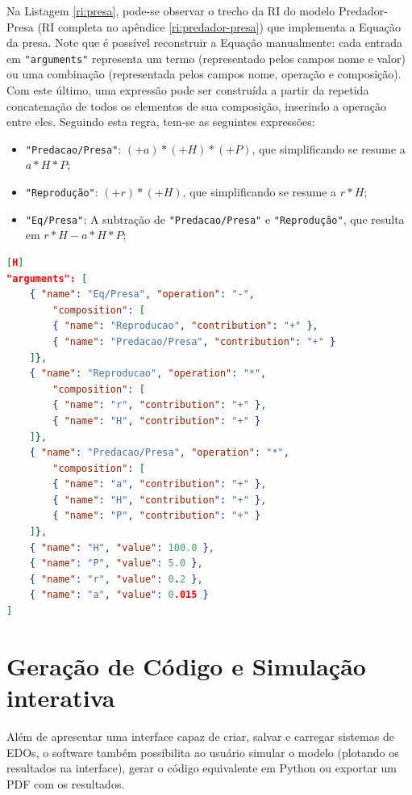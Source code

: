 \documentclass[
	12pt,				%
	openright,			%
	oneside,			%
	a4paper,			%
	main=brazil,
	english,			%
	]{ufsj-abntex2}
\begin{document}
Na Listagem \ref{ri:presa}, pode-se observar o trecho da RI do modelo Predador-Presa (RI completa no apêndice \ref{ri:predador-presa}) que implementa a Equação da presa. Note que é possível reconstruir a Equação manualmente: cada entrada em \texttt{"arguments"} representa um termo (representado pelos campos nome e valor) ou uma combinação (representada pelos campos nome, operação e composição). Com este último, uma expressão pode ser construída a partir da repetida concatenação de todos os elementos de sua composição, inserindo a operação entre eles. Seguindo esta regra, tem-se as seguintes expressões:

\begin{itemize}
    \item \texttt{"Predacao/Presa"}: \((+a)*(+H)*(+P)\), que simplificando se resume a \(a*H*P\);
    \item \texttt{"Reprodução"}: \((+r)*(+H)\), que simplificando se resume a \(r*H\);
    \item \texttt{"Eq/Presa"}: A subtração de \texttt{"Predacao/Presa"} e \texttt{"Reprodução"}, que resulta em \(r*H-a*H*P\);
\end{itemize}

\begin{lstlisting}[language=json, label=ri:presa, caption=Trecho da RI que define termos e combinações usadas para definir a Equação da presa.][H]
"arguments": [
    { "name": "Eq/Presa", "operation": "-",
        "composition": [
        { "name": "Reproducao", "contribution": "+" },
        { "name": "Predacao/Presa", "contribution": "+" }
    ]},
    { "name": "Reproducao", "operation": "*",
        "composition": [
        { "name": "r", "contribution": "+" },
        { "name": "H", "contribution": "+" }
    ]},
    { "name": "Predacao/Presa", "operation": "*",
        "composition": [
        { "name": "a", "contribution": "+" },
        { "name": "H", "contribution": "+" },
        { "name": "P", "contribution": "+" }
    ]},
    { "name": "H", "value": 100.0 },
    { "name": "P", "value": 5.0 },
    { "name": "r", "value": 0.2 },
    { "name": "a", "value": 0.015 }
]
\end{lstlisting}

\section{Geração de Código e Simulação interativa}

Além de apresentar uma interface capaz de criar, salvar e carregar sistemas de EDOs, o software também possibilita ao usuário simular o modelo (plotando os resultados na interface), gerar o código equivalente em Python ou exportar um PDF com os resultados.
\end{document}
